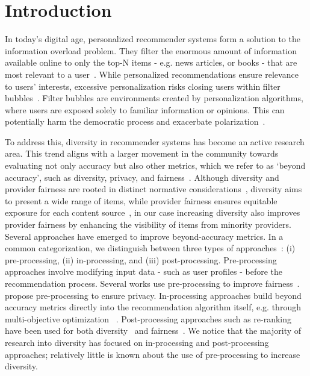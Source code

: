 \documentclass[runningheads]{llncs}
\begin{document}
\section{Introduction}
\label{sec:intro}
In today's digital age, personalized recommender systems form a solution to the information overload problem. 
They filter the enormous amount of information available online to only the top-N items - e.g. news articles, or books - that are most relevant to a user~\cite{liu2019diverse,meng2023survey}.
While personalized recommendations ensure relevance to users' interests, excessive personalization risks closing users within filter bubbles~\cite{pariser2011filter,Michiels2023How}. 
Filter bubbles are environments created by personalization algorithms, where users are exposed solely to familiar information or opinions.
This can potentially harm the democratic process and exacerbate polarization~\cite{pariser2011filter}.

To address this, diversity in recommender systems has become an active research area. 
This trend aligns with a larger movement in the community towards evaluating not only accuracy but also other metrics, which we refer to as `beyond accuracy', such as diversity, privacy, and fairness~\cite{Kaminskas2016Diversity,zhao2023fairness,Yao2023Fairness}.
Although diversity and provider fairness are rooted in distinct normative considerations~\cite{Ekstrand2022}, diversity aims to present a wide range of items, while provider fairness ensures equitable exposure for each content source~\cite{Liu2024Measuring}, in our case increasing diversity also improves provider fairness by enhancing the visibility of items from minority providers.
Several approaches have emerged to improve beyond-accuracy metrics. 
In a common categorization, we distinguish between three types of approaches~\cite{zhao2023fairness}: (i) pre-processing, (ii) in-processing, and (iii) post-processing. 
Pre-processing approaches involve modifying input data - such as user profiles - before the recommendation process. 
Several works use pre-processing to improve fairness~\cite{Rastegarpanah2019Fighting,pmlr-v81-ekstrand18a,boratto2021interplay,Boratto2024FairGNN}. 
\cite{slokom2021PerBlur} propose pre-processing to ensure privacy. 
In-processing approaches build beyond accuracy metrics directly into the recommendation algorithm itself, e.g. through multi-objective optimization
~\cite{Zheng2021DGCN,Stamenkovic2022Choosing,raza2022accuracy,oliveira2017multiobjective,Hansen2021Shifting,wu2022end}.  
Post-processing approaches such as re-ranking have been used for both diversity~\cite{Mansoury2020FairMatch} and fairness~\cite{Zehlike2017FA*IR,Zehlike2022FAIR}. 
We notice that the majority of research into diversity has focused on in-processing and post-processing approaches; relatively little is known about the use of pre-processing to increase diversity. 
\end{document}
